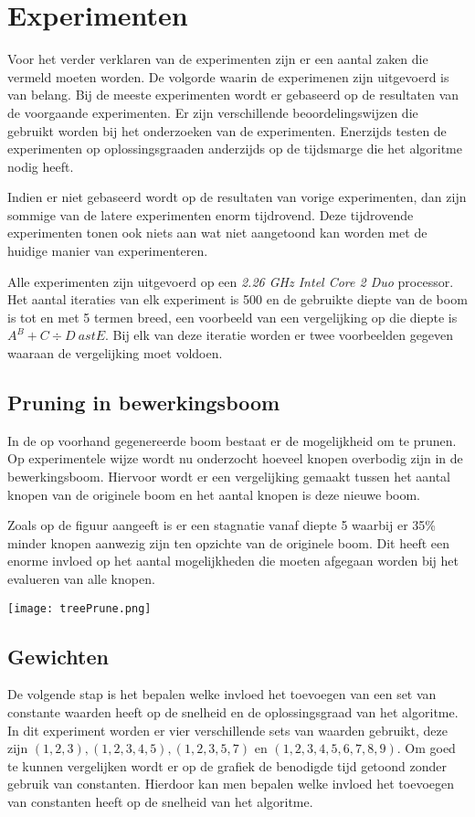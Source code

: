 \documentclass[Main.tex]{subfiles}
\begin{document}
\section{Experimenten}
Voor het verder verklaren van de experimenten zijn er een aantal zaken die vermeld moeten worden. De volgorde waarin de experimenen zijn uitgevoerd is van belang. Bij de meeste experimenten wordt er gebaseerd op de resultaten van de voorgaande experimenten. Er zijn verschillende beoordelingswijzen die gebruikt worden bij het onderzoeken van de experimenten. Enerzijds testen de experimenten op oplossingsgraad\footnotemark[\ref{note:oplossingsgraad}] en anderzijds op de tijdsmarge die het algoritme nodig heeft. 
\par
Indien er niet gebaseerd wordt op de resultaten van vorige experimenten, dan zijn sommige van de latere experimenten enorm tijdrovend. Deze tijdrovende experimenten tonen ook niets aan wat niet aangetoond kan worden met de huidige manier van experimenteren.
\par
Alle experimenten zijn uitgevoerd op een \textit{2.26 GHz Intel Core 2 Duo} processor. Het aantal iteraties van elk experiment is 500 en de gebruikte diepte van de boom is tot en met 5 termen breed, een voorbeeld van een vergelijking op die diepte is $A^{B}+C \div D \ ast E$. Bij elk van deze iteratie worden er twee voorbeelden gegeven waaraan de vergelijking moet voldoen.

\subsection{Pruning in bewerkingsboom}

In de op voorhand gegenereerde boom bestaat er de mogelijkheid om te prunen. Op experimentele wijze wordt nu onderzocht hoeveel knopen overbodig zijn in de bewerkingsboom. Hiervoor wordt er een vergelijking gemaakt tussen het aantal knopen van de originele boom en het aantal knopen is deze nieuwe boom.
\par Zoals op de figuur %
 aangeeft is er een stagnatie vanaf diepte 5 waarbij er 35\% minder knopen aanwezig zijn ten opzichte van de originele boom. Dit heeft een enorme invloed op het aantal mogelijkheden die moeten afgegaan worden bij het evalueren van alle knopen.
\begin{center}
\texttt{[image: treePrune.png]}
\end{center}

\subsection{Gewichten}
De volgende stap is het bepalen welke invloed het toevoegen van een set van constante waarden heeft op de snelheid en de oplossingsgraad van het algoritme. In dit experiment worden er vier verschillende sets van waarden gebruikt, deze zijn $(1,2,3), (1,2,3,4,5), (1,2,3,5,7)$ en $(1,2,3,4,5,6,7,8,9)$. Om goed te kunnen vergelijken wordt er op de grafiek de benodigde tijd getoond zonder gebruik van constanten. Hierdoor kan men bepalen welke invloed het toevoegen van constanten heeft op de snelheid van het algoritme.
\end{document}

